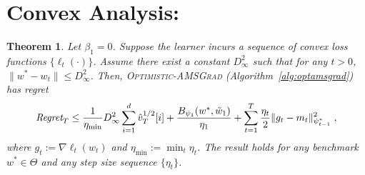 \documentclass[11pt]{article}
\newtheorem{Theorem}{Theorem}
\theoremstyle{k}
\begin{document}
\clearpage

\section{Convex Analysis:}

\begin{Theorem} \label{thm:convexmain}
Let $\beta_{1}=0$. Suppose the learner incurs a sequence of convex loss functions $\{ \ell_{t}(\cdot) \}$.
Assume there exist a constant $D_{\infty}^2$ such that for any $t >0$, $\|w^* - w_t\| \leq D_{\infty}^2$.
Then,  \textsc{Optimistic-AMSGrad} (Algorithm~\ref{alg:optamsgrad}) has regret 
\begin{equation} \label{bound:optada}
\begin{aligned}
 \text{\it Regret}_T \leq \frac{1}{\eta_{\min}} D_{\infty}^2 \sum_{i=1}^d \hat{v}_{T}^{1/2}[i] + \frac{ B_{\psi_1}(w^*, \tilde{w}_{1})}{\eta_1}
+ \sum_{t=1}^T\frac{\eta_t}{2} \| g_t - m_t  \|_{\psi_{t-1}^*}^2  \;,
\end{aligned}
\end{equation}
where $g_{t}:= \nabla \ell_{t}(w_t)$ and $\eta_{{\min}} := \min_{{t}} \eta_{t}$.
The result holds for any benchmark $w^{*} \in \Theta$ and any step size sequence $\{ \eta_t \}$.
\end{Theorem}
\end{document}
